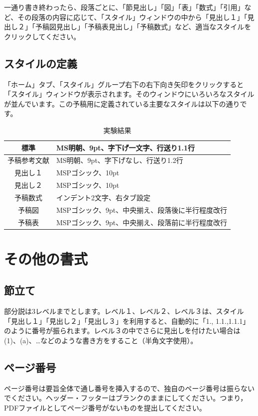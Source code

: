 \documentclass[9pt,twocolumn]{jarticle}
\begin{document}
一通り書き終わったら、段落ごとに、「節見出し」「図」「表」「数式」「引用」など、その段落の内容に応じて、「スタイル」ウィンドウの中から「見出し１」「見出し２」「予稿図見出し」「予稿表見出し」「予稿数式」など、適当なスタイルをクリックしてください。
\subsection{スタイルの定義}
「ホーム」タブ、「スタイル」グループ右下の右下向き矢印をクリックすると「スタイル」ウィンドウが表示されます。そのウィンドウにいろいろなスタイルが並んでいます。この予稿用に定義されている主要なスタイルは以下の通りです。

\begin{table}[h]
\vspace{-1.5em}
\begin{center}
\caption{実験結果}
\label{tab:1}
\begin{tabular}{|c|p{5cm}|}\hline
標準 & MS明朝、9pt、字下げ一文字、行送り1.1行\\ \hline
予稿参考文献 & MS明朝、9pt、字下げなし、行送り1.2行\\ \hline
見出し１ & MSPゴシック、10pt\\ \hline
見出し２ & MSPゴシック、10pt\\ \hline
予稿数式 & インデント2文字、右タブ設定\\ \hline
予稿図 & MSPゴシック、9pt、中央揃え、段落後に半行程度改行\\ \hline
予稿表 & MSPゴシック、9pt、中央揃え、段落前に半行程度改行\\ \hline
\end{tabular}
\vspace{-2em}
\end{center}
\end{table}
\section{その他の書式}
\subsection{節立て}
部分説は3レベルまでとします。レベル１、レベル２、レベル３は、スタイル「見出し１」「見出し２」「見出し３」を利用すると、自動的に「1., 1.1.,1.1.1」のように番号が振られます。レベル３の中でさらに見出しを付けたい場合は (1)、(a)、…などのような書き方をすること（半角文字使用）。
\subsection{ページ番号}
ページ番号は要旨全体で通し番号を挿入するので、独自のページ番号は振らないでください。ヘッダー・フッターはブランクのままにしてください。つまり，PDFファイルとしてページ番号がないものを提出してください。
\end{document}
